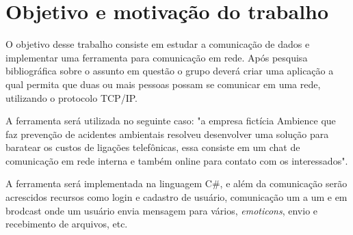 \section{Objetivo e motivação do trabalho}
	O objetivo desse trabalho consiste em estudar a comunicação de dados e implementar uma ferramenta para comunicação em rede. Após pesquisa bibliográfica sobre o assunto em questão o grupo deverá criar uma aplicação a qual permita que duas ou mais pessoas possam se comunicar em uma rede, utilizando o protocolo TCP/IP.
	
	A ferramenta será utilizada no seguinte caso: "a empresa fictícia Ambience que faz prevenção de acidentes ambientais resolveu desenvolver uma solução para baratear os custos de ligações telefônicas, essa consiste em um chat de comunicação em rede interna e também online para contato com os interessados".
	
	A ferramenta será implementada na linguagem C\#, e além da comunicação serão acrescidos recursos como login e cadastro de usuário, comunicação um a um e em brodcast onde um usuário envia mensagem para vários, \textit{emoticons}, envio e recebimento de arquivos, etc.